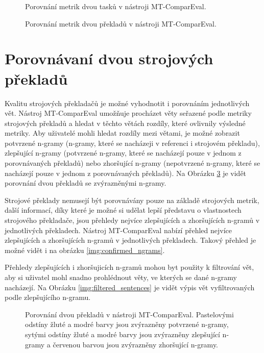 \begin{figure}
	\caption{Porovnání metrik dvou tasků v nástroji MT-ComparEval.}
	\label{img:compare_metrics_tasks}
\end{figure}

\begin{figure}
	\caption{Porovnání metrik dvou překladů v nástroji MT-ComparEval.}
	\label{img:compare_metrics_sentences}
\end{figure}


\section{Porovnávaní dvou strojových překladů}
Kvalitu strojových překladačů je možné vyhodnotit i porovnáním jednotlivých vět.
Nástroj MT-ComparEval umožňuje procházet věty seřazené podle metriky strojových překladů 
  a hledat v těchto větách rozdíly,
  které ovlivnily výsledné metriky.
Aby uživatelé mohli hledat rozdíly mezi větami,
  je možné zobrazit potvrzené n-gramy (n-gramy, které se nacházeji v referenci i strojovém překladu),
  zlepšující n-gramy (potvrzené n-gramy, které se nacházejí pouze v jednom z porovnávaných překladů)
  nebo zhoršující n-gramy (nepotvrzené n-gramy, které se nacházejí pouze v jednom z porovnávaných překladů).
Na Obrázku \ref{img:compare_sentences} je vidět porovnání dvou překladů se zvýrazněnými n-gramy.

Strojové překlady nemusejí být porovnávány pouze na základě strojových metrik,
  další informací,
  díky které je možné si udělat lepší představu o vlastnostech strojového překladače,
  jsou přehledy nejvíce zlepšujících a zhoršujících n-gramů v jednotlivých překladech.
Nástroj MT-ComparEval nabízí přehled nejvíce zlepšujících a zhoršujících n-gramů
  v jednotlivých překladech.
Takový přehled je možné vidět i na obrázku \ref{img:confirmed_ngrams}.

Přehledy zlepšujících i zhoršujicích n-gramů mohou byt použity k filtrování vět,
  aby si uživatel mohl snadno prohlédnout věty,
  ve kterých se dané n-gramy nacházejí.
Na Obrázku \ref{img:filtered_sentences} je vidět výpis vět vyfiltrovaných podle zlepšujícího n-gramu.


\begin{figure}
	\caption{
		Porovnání dvou překladů v nástroji MT-ComparEval.
		Pastelovými odstíny žluté a modré barvy jsou zvýrazněny potvrzené n-gramy,
		sytými odstíny žluté a modré barvy jsou zvýrazněny zlepšující n-gramy
		a červenou barvou jsou zvýrazněny zhoršující n-gramy.
	}
	\label{img:compare_sentences}
\end{figure}


